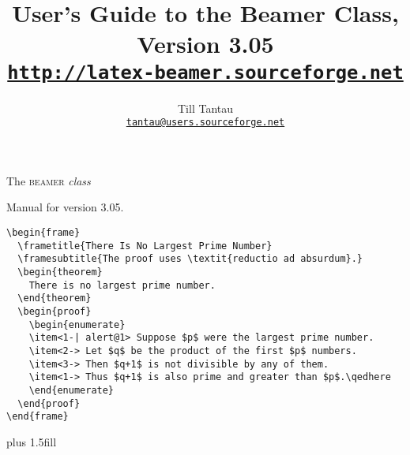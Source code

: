 \documentclass{ltxdoc}
\def\version{3.05}
\begin{document}
{
  \parindent0pt
\vbox{}
\vskip 3.5cm
\Huge
The \textsc{beamer} \textit{class}

\Large
Manual for version \version.
\vskip 3cm

\normalsize
\begin{verbatim}
\begin{frame}
  \frametitle{There Is No Largest Prime Number}
  \framesubtitle{The proof uses \textit{reductio ad absurdum}.}
  \begin{theorem}
    There is no largest prime number.
  \end{theorem}
  \begin{proof}
    \begin{enumerate}
    \item<1-| alert@1> Suppose $p$ were the largest prime number.
    \item<2-> Let $q$ be the product of the first $p$ numbers.
    \item<3-> Then $q+1$ is not divisible by any of them.
    \item<1-> Thus $q+1$ is also prime and greater than $p$.\qedhere
    \end{enumerate}      
  \end{proof}
\end{frame}
\end{verbatim}
\qquad{}
\vskip 0cm plus 1.5fill
\vbox{}         
\clearpage
}


\title{User's Guide to the Beamer Class, Version \version\\
\Large\href{http://latex-beamer.sourceforge.net}{\texttt{http://latex-beamer.sourceforge.net}}}
\author{Till Tantau\\
  \href{mailto:tantau@users.sourceforge.net}{\texttt{tantau@users.sourceforge.net}}}

\maketitle

\tableofcontents



\end{document}
